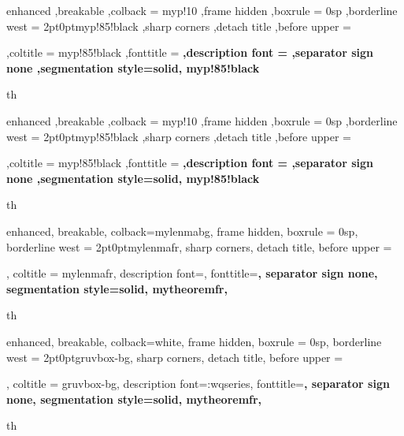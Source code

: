 


{%
	enhanced
	,breakable
	,colback = myp!10
	,frame hidden
	,boxrule = 0sp
	,borderline west = {2pt}{0pt}{myp!85!black}
	,sharp corners
	,detach title
	,before upper = \tcbtitle\par\smallskip
	,coltitle = myp!85!black
	,fonttitle = \bfseries\sffamily
	,description font = \mdseries
	,separator sign none
	,segmentation style={solid, myp!85!black}
}
{th}


{%
	enhanced
	,breakable
	,colback = myp!10
	,frame hidden
	,boxrule = 0sp
	,borderline west = {2pt}{0pt}{myp!85!black}
	,sharp corners
	,detach title
	,before upper = \tcbtitle\par\smallskip
	,coltitle = myp!85!black
	,fonttitle = \bfseries{}\selectfont 
	,description font = \mdseries{}\selectfont 
	,separator sign none
	,segmentation style={solid, myp!85!black}
}
{th}



{
	enhanced,
	breakable,
	colback=mylenmabg,
	frame hidden,
	boxrule = 0sp,
	borderline west = {2pt}{0pt}{mylenmafr},
	sharp corners,
	detach title,
	before upper = \tcbtitle\par\smallskip,
	coltitle = mylenmafr,
	description font=\mdseries{}\selectfont,
	fonttitle=\selectfont\bfseries,
	separator sign none,
	segmentation style={solid, mytheoremfr},
}
{th}


{
	enhanced,
	breakable,
	colback=white,
	frame hidden,
	boxrule = 0sp,
	borderline west = {2pt}{0pt}{gruvbox-bg},
	sharp corners,
	detach title,
	before upper = \tcbtitle\par\smallskip,
	coltitle = gruvbox-bg,
	description font=\md:wqseries\selectfont,
	fonttitle=\selectfont\bfseries,
	separator sign none,
	segmentation style={solid, mytheoremfr},
}
{th}


